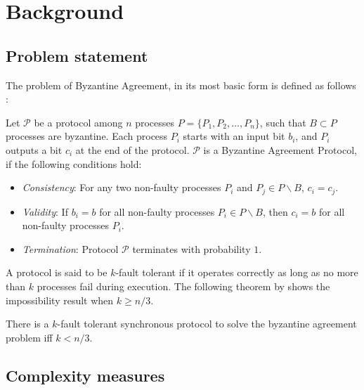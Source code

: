﻿\section{Background}
\label{sec:background}

\subsection{Problem statement}
The problem of Byzantine Agreement, in its most basic form is defined as follows \cite{PeaseSL80}:

\begin{definition}
    Let $\mathcal{P}$ be a protocol among $n$ processes $P = \{ P_1, P_2, \dots, P_n\}$, such that $B \subset P$ processes are byzantine. Each process $P_i$ starts with an input bit $b_i$, and $P_i$ outputs a bit $c_i$ at the end of the protocol. $\mathcal{P}$ is a Byzantine Agreement Protocol, if the following conditions hold:
\begin{itemize}
    \item \textit{Consistency}: For any two non-faulty processes $P_i$ and $P_j \in P \backslash B$, $c_i = c_j$.
    \item \textit{Validity}: If $b_i = b$ for all non-faulty processes $P_i \in P \backslash B$, then $c_i = b$ for all non-faulty processes $P_i$.
    \item \textit{Termination}: Protocol $\mathcal{P}$ terminates with probability $1$.
\end{itemize}
\end{definition}

A protocol is said to be $k$-fault tolerant if it operates correctly as long as no more than $k$ processes fail during execution. The following theorem by \cite{LamportSP82,PeaseSL80} shows the impossibility result when $k \geq n/3$.

\begin{theorem}
There is a $k$-fault tolerant synchronous protocol to solve the byzantine agreement problem iff $k < n/3$.
\end{theorem}

\subsection{Complexity measures}

